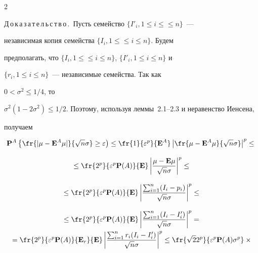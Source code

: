 \begin{multicols}{2}





\noindent


Д\,о\,к\,а\,з\,а\,т\,е\,л\,ь\,с\,т\,в\,о\,.\ Пусть  семейство $\{I'_i, 1\le i\le$\linebreak $\le n\}$~---


независимая копия семейства $\{I_i, 1\le$\linebreak $\le i\le n\}$. Будем


предполагать, что $\{I_i, 1\le$\linebreak $\le i\le n\}$, $\{I'_i, 1\le i\le n\}$ и


$\{r_i, 1\le i\le n\}$~--- независимые семейства. Так как


$0<\sigma^2\le 1/4$, то


$\sigma^2(1-2\sigma^2)\le {1}/{2}$. Поэтому, используя леммы~2.1--2.3 и неравенство Иенсена,


 получаем


\begin{multline}


\P^A\left\{\fr{|\mu-{\E}^A\mu|}{\sqrt{n}\sigma} \ge


\varepsilon\right)\le


\fr{1}{\varepsilon^p}{\E^A}\left|\fr{\mu-{\E}^A\mu}{\sqrt{n}\sigma}\right|^p


\le{}\\[9pt]


{}\le \fr{2^p}{\varepsilon^p\P(A)}{\E}\left|\frac{\mu-{\E}\mu}{\sqrt{n}{\sigma}}\right|^p


\le{}\\[9pt]


{}


\le\fr{2^p}{\varepsilon^p\P(A)}{\E}\left|\frac{\sum_{i=1}^n(I_i-p_i)}{\sqrt{n}{\sigma}}\right|^p \le{}\\[9pt]


{}


\le\fr{2^p}{\varepsilon^p\P(A)}{\E}\left|\frac{\sum_{i=1}^n(I_i-I'_i)}{\sqrt{n}{\sigma}}\right|^p={}\\


{}


=\fr{2^p}{\varepsilon^p\P(A)}{\E_r}{\E}\left|\frac{\sum_{i=1}^nr_i


(I_i-I'_i)}{\sqrt{n}{\sigma}}\right|^p


\le\fr{\sqrt{2}2^p}{\varepsilon^p\P(A)\sigma^p


}\times{}\\



\end{multline}
\end{multicols}
